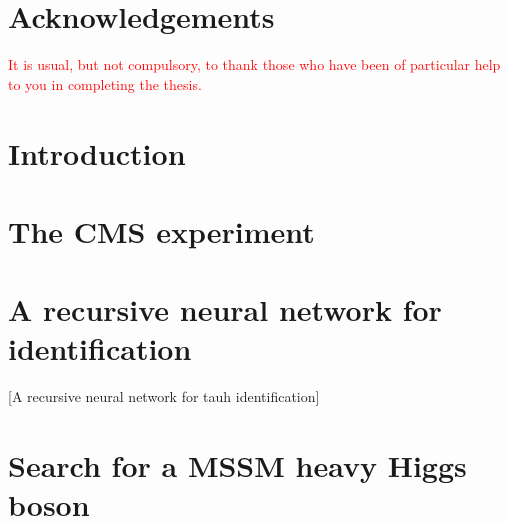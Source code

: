 \documentclass[12pt,twoside]{report}
\begin{document}

    


    \chapter*{Acknowledgements}
    \textcolor{red}{It is usual, but not compulsory, to thank those who have been of particular help to you in completing the thesis.}

    {\hypersetup{linkcolor=black}
        \tableofcontents
        \listoffigures
        \listoftables
    }
        {\hypersetup{linkcolor=mycolor}}
    
    \chapter{Introduction} 
    
     
    \chapter{The CMS experiment}
    
    
    \chapter{A recursive neural network for \tauh identification}[A
    recursive neural network for tauh identification]
    
    
%     
    
    \chapter{Search for a MSSM heavy Higgs boson}
    
    
\end{document}
